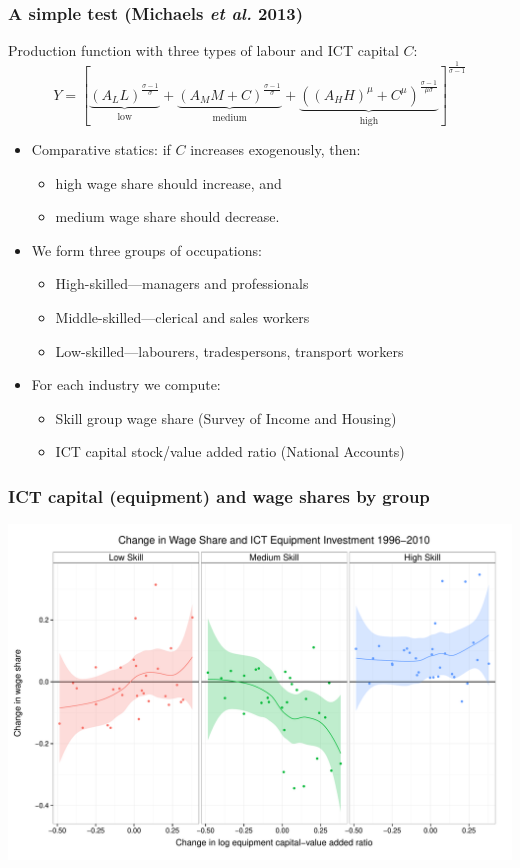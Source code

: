\documentclass[red]{beamer}
\newcommand{\vitem}{\vfill\item}
\begin{document}
\begin{frame}[c]
  \frametitle{A simple test (Michaels {\em et al.} 2013)}
Production function with three types of labour and ICT capital $C$:
$$
Y = \left[
  \underbrace{(A_LL)^\frac{\sigma-1}{\sigma}}_{\text{low}}
  +
  \underbrace{(A_MM + C)^\frac{\sigma-1}{\sigma}}_{\text{medium}}
  +
  \underbrace{((A_HH)^\mu + C^\mu)^\frac{\sigma-1}{\mu\sigma}}_{\text{high}}
  \right]^\frac{1}{\sigma-1}
$$
  \begin{itemize}
  \item Comparative statics: if $C$ increases exogenously, then: 
  \begin{itemize}
  \item high wage share should increase, and 
  \item medium wage share should decrease.
  \end{itemize}
  \vitem We form three groups of occupations:
  \begin{itemize}
  \item High-skilled---managers and professionals
  \item Middle-skilled---clerical and sales workers
  \item Low-skilled---labourers, tradespersons, transport workers
  \end{itemize}
  \vitem For each industry we compute:
  \begin{itemize}
  \item Skill group wage share (Survey of Income and Housing)
  \item ICT capital stock/value added ratio (National Accounts)
  \end{itemize}
\end{itemize}
\end{frame}

\begin{frame}[c]
  \frametitle{ICT capital (equipment) and wage shares by group}
\begin{center}
\includegraphics[width=\textwidth]{slides_fig/wage_share_equipment_skill.pdf}
\end{center}
\end{frame}
\end{document}
